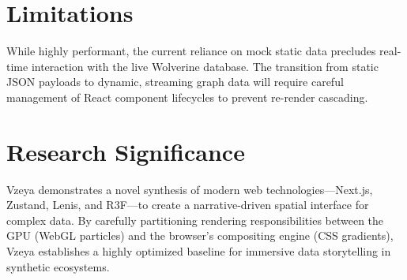 \section{Limitations}
While highly performant, the current reliance on mock static data precludes real-time interaction with the live Wolverine database. The transition from static JSON payloads to dynamic, streaming graph data will require careful management of React component lifecycles to prevent re-render cascading.

\section{Research Significance}
Vzeya demonstrates a novel synthesis of modern web technologies---Next.js, Zustand, Lenis, and R3F---to create a narrative-driven spatial interface for complex data. By carefully partitioning rendering responsibilities between the GPU (WebGL particles) and the browser's compositing engine (CSS gradients), Vzeya establishes a highly optimized baseline for immersive data storytelling in synthetic ecosystems.
